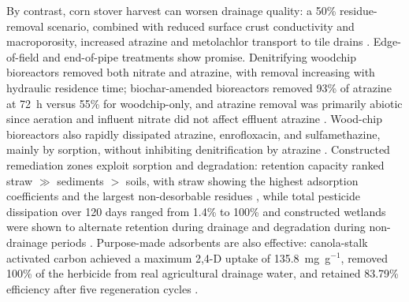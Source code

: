 By contrast, corn stover harvest can worsen drainage quality: a 50\% residue-removal scenario, combined with reduced surface crust conductivity and macroporosity, increased atrazine and metolachlor transport to tile drains \parencite{Shipitalo2016}. Edge-of-field and end-of-pipe treatments show promise. Denitrifying woodchip bioreactors removed both nitrate and atrazine, with removal increasing with hydraulic residence time; biochar-amended bioreactors removed 93\% of atrazine at 72~h versus 55\% for woodchip-only, and atrazine removal was primarily abiotic since aeration and influent nitrate did not affect effluent atrazine \parencite{Hassanpour2019}. Wood-chip bioreactors also rapidly dissipated atrazine, enrofloxacin, and sulfamethazine, mainly by sorption, without inhibiting denitrification by atrazine \parencite{Ilhan2011}. Constructed remediation zones exploit sorption and degradation: retention capacity ranked straw $\gg$ sediments $>$ soils, with straw showing the highest adsorption coefficients and the largest non-desorbable residues \parencite{Vallée2014}, while total pesticide dissipation over 120 days ranged from 1.4\% to 100\% and constructed wetlands were shown to alternate retention during drainage and degradation during non-drainage periods \parencite{Vallée2016}. Purpose-made adsorbents are also effective: canola-stalk activated carbon achieved a maximum 2,4-D uptake of 135.8~mg~g$^{-1}$, removed 100\% of the herbicide from real agricultural drainage water, and retained 83.79\% efficiency after five regeneration cycles \parencite{Amiri2020}.

